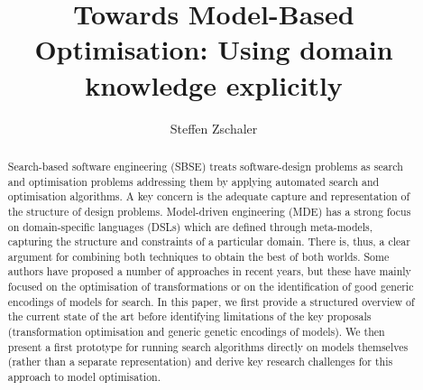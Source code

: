 \documentclass[draft]{llncs}
\title{Towards Model-Based Optimisation: Using domain knowledge explicitly}
\author{Steffen Zschaler}
\institute{
	Department of Informatics\\
	King's College London\\
	\email{szschaler@acm.org}
}
\begin{document}
	\maketitle
	
	\begin{abstract}
		Search-based software engineering (SBSE) treats soft\-ware-design problems as search and optimisation problems addressing them by applying automated
		search and optimisation algorithms. A key concern is the adequate capture and representation of the structure of design problems. Model-driven
		engineering (MDE) has a strong focus on domain-specific languages (DSLs) which are defined through meta-models, capturing the structure and constraints of a
		particular domain. There is, thus, a clear argument for combining both techniques to obtain the best of both worlds. Some authors have proposed a number of
		approaches in recent years, but these have mainly focused on the optimisation of transformations or on the identification of good generic encodings of models
		for search.
		In this paper, we first provide a structured overview of the current state of the art before identifying limitations of the key proposals (transformation
		optimisation and generic genetic encodings of models). We then present a first prototype for running search algorithms directly on models themselves (rather
		than a separate representation) and derive key research challenges for this approach to model optimisation.
		
		\ifdraft
		\fi
		
	\end{abstract}
	
	
	
	

	
	
		
	
	
	
		
	
	
	
	
\end{document}
